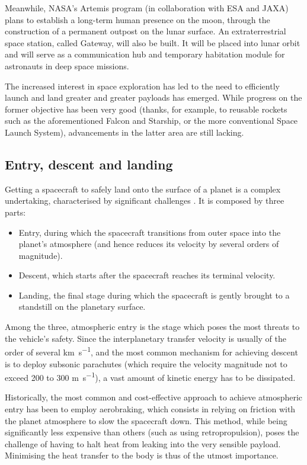 Meanwhile, NASA's Artemis program (in collaboration with ESA and JAXA) plans to establish a long-term human presence on the moon, through the construction of a permanent outpost on the lunar surface. An extraterrestrial space station, called Gateway, will also be built. It will be placed into lunar orbit and will serve as a communication hub and temporary habitation module for astronauts in deep space missions.

The increased interest in space exploration has led to the need to efficiently launch and land greater and greater payloads has emerged. While progress on the former objective has been very good (thanks, for example, to reusable rockets such as the aforementioned Falcon and Starship, or the more conventional Space Launch System), advancements in the latter area are still lacking.

\subsection{Entry, descent and landing}
Getting a spacecraft to safely land onto the surface of a planet is a complex undertaking, characterised by significant challenges \cite{aerothermonotes}. It is composed by three parts: 
\begin{itemize}
    \item Entry, during which the spacecraft transitions from outer space into the planet's atmosphere (and hence reduces its velocity by several orders of magnitude).
    \item Descent, which starts after the spacecraft reaches its terminal velocity.
    \item Landing, the final stage during which the spacecraft is gently brought to a standstill on the planetary surface.
\end{itemize}

Among the three, atmospheric entry is the stage which poses the most threats to the vehicle's safety. Since the interplanetary transfer velocity is usually of the order of several \si{\km\per\s}, and the most common mechanism for achieving descent is to deploy subsonic parachutes (which require the velocity magnitude not to exceed 200 to 300 \si{\m\per\s}), a vast amount of kinetic energy has to be dissipated. 

Historically, the most common and cost-effective approach to achieve atmospheric entry has been to employ aerobraking, which consists in relying on  friction with the planet atmosphere to slow the spacecraft down. This method, while being significantly less expensive than others (such as using retropropulsion), poses the challenge of having to halt heat from leaking into the very sensible payload. Minimising the heat transfer to the body is thus of the utmost importance.

